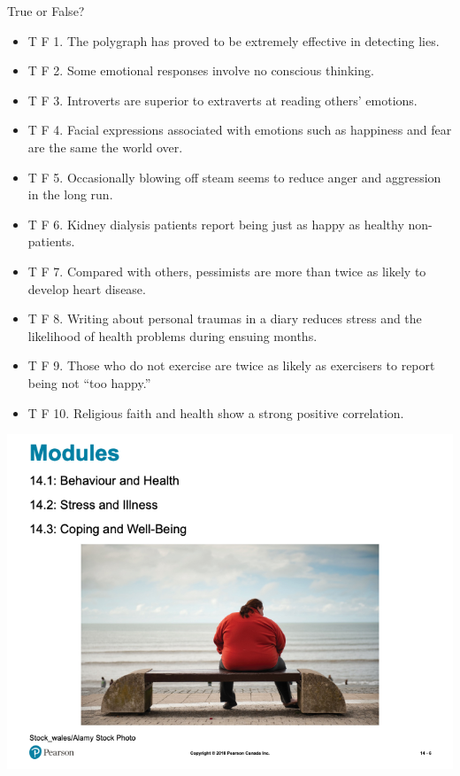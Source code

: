 \documentclass[
]{book}
\providecommand{\tightlist}{%
  \setlength{\itemsep}{0pt}\setlength{\parskip}{0pt}}
\begin{document}
\begin{reflect}
True or False?

\begin{itemize}
\tightlist
\item
  T F 1. The polygraph has proved to be extremely effective in detecting lies.\\
\item
  T F 2. Some emotional responses involve no conscious thinking.\\
\item
  T F 3. Introverts are superior to extraverts at reading others' emotions.\\
\item
  T F 4. Facial expressions associated with emotions such as happiness and fear are the same the world over.\\
\item
  T F 5. Occasionally blowing off steam seems to reduce anger and aggression in the long run.\\
\item
  T F 6. Kidney dialysis patients report being just as happy as healthy non-patients.\\
\item
  T F 7. Compared with others, pessimists are more than twice as likely to develop heart disease.\\
\item
  T F 8. Writing about personal traumas in a diary reduces stress and the likelihood of health problems during ensuing months.\\
\item
  T F 9. Those who do not exercise are twice as likely as exercisers to report being not ``too happy.''\\
\item
  T F 10. Religious faith and health show a strong positive correlation.
\end{itemize}

\includegraphics{assets/unit_8/slide_6.png}


\end{reflect}
\end{document}
